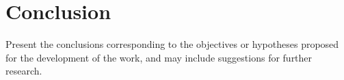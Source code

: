 \chapter{Conclusion}

Present the conclusions corresponding to the objectives or hypotheses proposed for the development of the work, and may include suggestions for further research.

